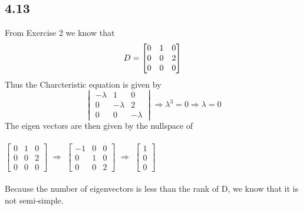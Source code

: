 \documentclass[letterpaper,12pt]{article}
\theoremstyle{definition}
\begin{document}
\subsection*{4.13}
From Exercise 2 we know that\\
\[
\smallskip\\
D = \begin{bmatrix} 
    0 & 1 & 0\\
    0 & 0 & 2\\
    0 & 0 & 0
\end{bmatrix}\\
\smallskip\\\]
Thus the Charcteristic equation is given by
\[ \begin{vmatrix}
-\lambda & 1 & 0\\
0 & -\lambda & 2\\
0 & 0 & -\lambda
\end{vmatrix} \Rightarrow \lambda^3 = 0 \Rightarrow \lambda = 0\]
The eigen vectors are then given by the nullspace of \\
\smallskip\\ 
$\begin{bmatrix} 
    0 & 1 & 0\\
    0 & 0 & 2\\
    0 & 0 & 0
\end{bmatrix}$  
$\Rightarrow$ 
$\begin{bmatrix} 
    -1 & 0 & 0\\
    0 & 1 & 0\\
    0 & 0 & 2
\end{bmatrix}$
$\Rightarrow$
$\begin{bmatrix}
1\\
0\\
0
\end{bmatrix}$\\
\smallskip\\
Because the number of eigenvectors is less than the rank of D, we know that 
it is not semi-simple.
\end{document}
